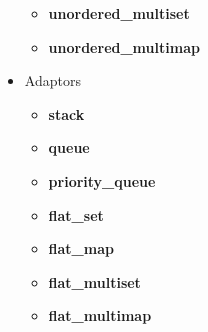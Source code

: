 \documentclass{article}
\begin{document}
\begin{itemize}
\begin{itemize}
            \item \textbf{unordered\_multiset}
            \item \textbf{unordered\_multimap}
          \end{itemize}
        \item Adaptors
          \begin{itemize}
            \item \textbf{stack}
            \item \textbf{queue}
            \item \textbf{priority\_queue}
            \item \textbf{flat\_set}
            \item \textbf{flat\_map}
            \item \textbf{flat\_multiset}
            \item \textbf{flat\_multimap}
          \end{itemize}
      \end{itemize}
\end{document}
